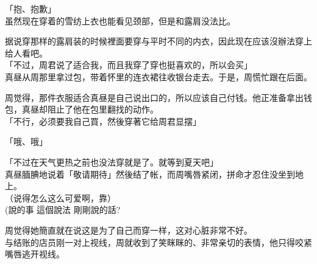 「抱、抱歉」\\

虽然现在穿着的雪纺上衣也能看见颈部，但是和露肩没法比。

据说穿那样的露肩装的时候裡面要穿与平时不同的内衣，因此现在应该沒辦法穿上给人看吧。\\

「不过，周君说了适合我，而且我穿了穿也挺喜欢的，所以会买」\\

真昼从周那里拿过包，带着怀里的连衣裙往收银台走去。于是，周慌忙跟在后面。

周觉得，那件衣服适合真昼是自己说出口的，所以应该自己付钱。他正准备拿出钱包，真昼却阻止了他在包里翻找的动作。\\

「不行，必须要我自己買，然後穿著它给周君显摆」

「哦、哦」

「不过在天气更热之前也没法穿就是了。就等到夏天吧」\\

真昼腼腆地说着「敬请期待」然後结了帐，而周嘴唇紧闭，拼命才忍住没坐到地上。\\

（说得怎么这么可爱啊，靠）\\(說的事 這個說法 剛剛說的話?

周觉得她簡直就在说这是为了自己而穿一样，这对心脏非常不好。\\

与结账的店员刚一对上视线，周就收到了笑眯眯的、非常亲切的表情，他只得咬紧嘴唇逃开视线。

